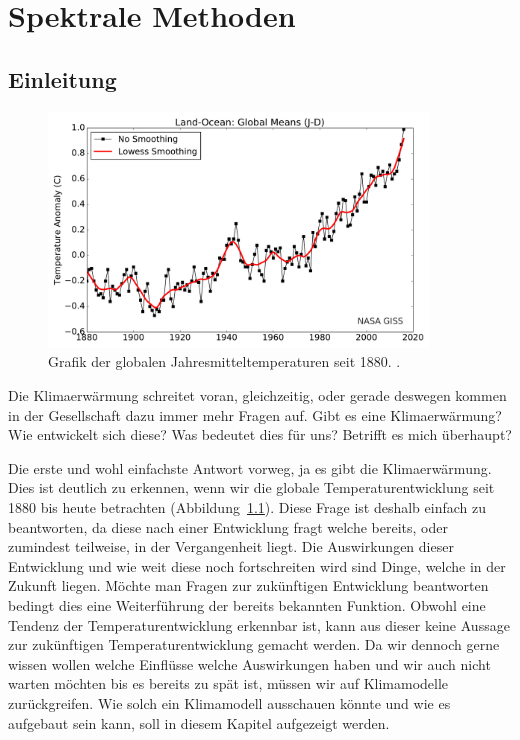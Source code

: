 \chapter{Spektrale Methoden\label{chapter:klima}}
\begin{refsection}

\section{Einleitung
\label{klima:section:einleitung}}
%

\begin{figure}
\centering
\includegraphics[width=0.9\textwidth]{klima/nasa_giss.pdf}
\caption{Grafik der globalen Jahresmitteltemperaturen seit 1880. \cite{klima:nasa}.
\label{klima:einleitung:nasa}}
\end{figure}

Die Klimaerwärmung
%
schreitet voran, gleichzeitig,
oder gerade deswegen kommen in der Gesellschaft dazu immer mehr
Fragen auf. Gibt es eine Klimaerwärmung? Wie entwickelt sich diese?
Was bedeutet dies für uns? Betrifft es mich überhaupt?

Die erste und wohl einfachste Antwort vorweg, ja es gibt die
Klimaerwärmung. Dies ist deutlich zu erkennen, wenn wir die globale
Temperaturentwicklung seit 1880 bis heute betrachten
(Abbildung~\ref{klima:einleitung:nasa}). Diese Frage ist deshalb
einfach zu beantworten, da diese nach einer Entwicklung fragt welche
bereits, oder zumindest teilweise, in der Vergangenheit liegt. Die
Auswirkungen dieser Entwicklung und wie weit diese noch fortschreiten
wird sind Dinge, welche in der Zukunft liegen. Möchte man Fragen
zur zukünftigen Entwicklung beantworten bedingt dies eine Weiterführung
der bereits bekannten Funktion. Obwohl eine Tendenz der
Temperaturentwicklung erkennbar ist, kann aus dieser keine Aussage
zur zukünftigen Temperaturentwicklung gemacht werden. Da wir dennoch
gerne wissen wollen welche Einflüsse welche Auswirkungen haben und
wir auch nicht warten möchten bis es bereits zu spät ist, müssen
wir auf Klimamodelle zurückgreifen. Wie solch ein
Klimamodell
%
ausschauen könnte und wie es aufgebaut
sein kann, soll in diesem Kapitel aufgezeigt werden.


\end{refsection}
